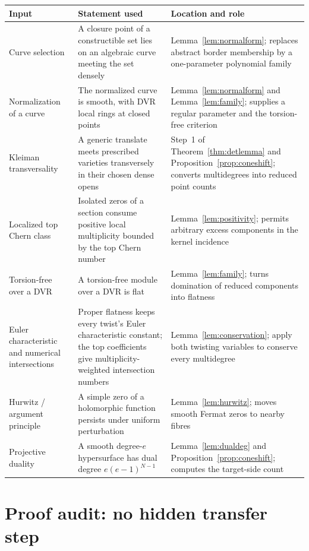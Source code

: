 \documentclass[acmsmall,screen,nonacm]{acmart}
\theoremstyle{definition}
\theoremstyle{remark}
\begin{document}
\begin{center}
\small
\begin{tabularx}{\textwidth}{@{}p{}p{}X@{}}
\toprule
Input & Statement used & Location and role \\
\midrule
Curve selection & A closure point of a constructible set lies on an algebraic curve meeting the set densely & Lemma~\ref{lem:normalform}; replaces abstract border membership by a one-parameter polynomial family \\
Normalization of a curve & The normalized curve is smooth, with DVR local rings at closed points & Lemma~\ref{lem:normalform} and Lemma~\ref{lem:family}; supplies a regular parameter and the torsion-free criterion \\
Kleiman transversality & A generic translate meets prescribed varieties transversely in their chosen dense opens & Step~1 of Theorem~\ref{thm:detlemma} and Proposition~\ref{prop:coneshift}; converts multidegrees into reduced point counts \\
Localized top Chern class & Isolated zeros of a section consume positive local multiplicity bounded by the top Chern number & Lemma~\ref{lem:positivity}; permits arbitrary excess components in the kernel incidence \\
Torsion-free over a DVR & A torsion-free module over a DVR is flat & Lemma~\ref{lem:family}; turns domination of reduced components into flatness \\
Euler characteristic and numerical intersections & Proper flatness keeps every twist's Euler characteristic constant; the top coefficients give multiplicity-weighted intersection numbers & Lemma~\ref{lem:conservation}; apply both twisting variables to conserve every multidegree \\
Hurwitz / argument principle & A simple zero of a holomorphic function persists under uniform perturbation & Lemma~\ref{lem:hurwitz}; moves smooth Fermat zeros to nearby fibres \\
Projective duality & A smooth degree-$e$ hypersurface has dual degree $e(e-1)^{N-1}$ & Lemma~\ref{lem:dualdeg} and Proposition~\ref{prop:coneshift}; computes the target-side count \\
\bottomrule
\end{tabularx}
\end{center}

\section{Proof audit: no hidden transfer step}\label{app:audit}
\end{document}
